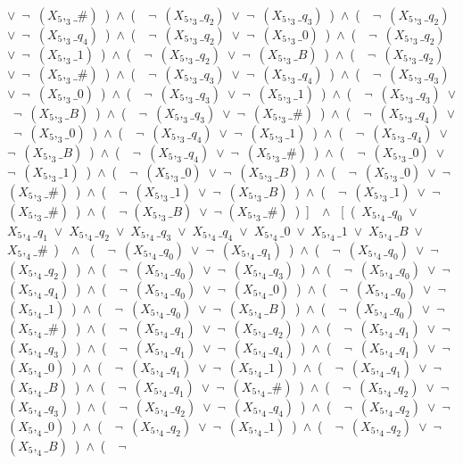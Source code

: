 ﻿\documentclass[a4paper,10pt]{article}
\begin{document}
$\vee$\ $\neg$\ $(X_5,_3\_\#)$\ )\ $\wedge$\ (\ \ $\neg$\ $(X_5,_3\_q_2)$\ $\vee$\ $\neg$\ $(X_5,_3\_q_3)$\ )\ $\wedge$\ (\ \ $\neg$\ $(X_5,_3\_q_2)$\ $\vee$\ $\neg$\ $(X_5,_3\_q_4)$\ )\ $\wedge$\ (\ \ $\neg$\ $(X_5,_3\_q_2)$\ $\vee$\ $\neg$\ $(X_5,_3\_0)$\ )\ $\wedge$\ (\ \ $\neg$\ $(X_5,_3\_q_2)$\ $\vee$\ $\neg$\ $(X_5,_3\_1)$\ )\ $\wedge$\ (\ \ $\neg$\ $(X_5,_3\_q_2)$\ $\vee$\ $\neg$\ $(X_5,_3\_B)$\ )\ $\wedge$\ (\ \ $\neg$\ $(X_5,_3\_q_2)$\ $\vee$\ $\neg$\ $(X_5,_3\_\#)$\ )\ $\wedge$\ (\ \ $\neg$\ $(X_5,_3\_q_3)$\ $\vee$\ $\neg$\ $(X_5,_3\_q_4)$\ )\ $\wedge$\ (\ \ $\neg$\ $(X_5,_3\_q_3)$\ $\vee$\ $\neg$\ $(X_5,_3\_0)$\ )\ $\wedge$\ (\ \ $\neg$\ $(X_5,_3\_q_3)$\ $\vee$\ $\neg$\ $(X_5,_3\_1)$\ )\ $\wedge$\ (\ \ $\neg$\ $(X_5,_3\_q_3)$\ $\vee$\ $\neg$\ $(X_5,_3\_B)$\ )\ $\wedge$\ (\ \ $\neg$\ $(X_5,_3\_q_3)$\ $\vee$\ $\neg$\ $(X_5,_3\_\#)$\ )\ $\wedge$\ (\ \ $\neg$\ $(X_5,_3\_q_4)$\ $\vee$\ $\neg$\ $(X_5,_3\_0)$\ )\ $\wedge$\ (\ \ $\neg$\ $(X_5,_3\_q_4)$\ $\vee$\ $\neg$\ $(X_5,_3\_1)$\ )\ $\wedge$\ (\ \ $\neg$\ $(X_5,_3\_q_4)$\ $\vee$\ $\neg$\ $(X_5,_3\_B)$\ )\ $\wedge$\ (\ \ $\neg$\ $(X_5,_3\_q_4)$\ $\vee$\ $\neg$\ $(X_5,_3\_\#)$\ )\ $\wedge$\ (\ \ $\neg$\ $(X_5,_3\_0)$\ $\vee$\ $\neg$\ $(X_5,_3\_1)$\ )\ $\wedge$\ (\ \ $\neg$\ $(X_5,_3\_0)$\ $\vee$\ $\neg$\ $(X_5,_3\_B)$\ )\ $\wedge$\ (\ \ $\neg$\ $(X_5,_3\_0)$\ $\vee$\ $\neg$\ $(X_5,_3\_\#)$\ )\ $\wedge$\ (\ \ $\neg$\ $(X_5,_3\_1)$\ $\vee$\ $\neg$\ $(X_5,_3\_B)$\ )\ $\wedge$\ (\ \ $\neg$\ $(X_5,_3\_1)$\ $\vee$\ $\neg$\ $(X_5,_3\_\#)$\ )\ $\wedge$\ (\ \ $\neg$ $(X_5,_3\_B)$\ $\vee$\ $\neg$ $(X_5,_3\_\#)$\ )\ ]\ \ $\wedge$ \ [\ (\ $X_5,_4\_q_0$\ $\vee$\ $X_5,_4\_q_1$\ $\vee$\ $X_5,_4\_q_2$\ $\vee$\ $X_5,_4\_q_3$\ $\vee$\ $X_5,_4\_q_4$\ $\vee$\ $X_5,_4\_0$\ $\vee$\ $X_5,_4\_1$\ $\vee$\ $X_5,_4\_B$\ $\vee$\ $X_5,_4\_\#$\ )\ \ $\wedge$ \ (\ \ $\neg$\ $(X_5,_4\_q_0)$\ $\vee$\ $\neg$\ $(X_5,_4\_q_1)$\ )\ $\wedge$\ (\ \ $\neg$\ $(X_5,_4\_q_0)$\ $\vee$\ $\neg$\ $(X_5,_4\_q_2)$\ )\ $\wedge$\ (\ \ $\neg$\ $(X_5,_4\_q_0)$\ $\vee$\ $\neg$\ $(X_5,_4\_q_3)$\ )\ $\wedge$\ (\ \ $\neg$\ $(X_5,_4\_q_0)$\ $\vee$\ $\neg$\ $(X_5,_4\_q_4)$\ )\ $\wedge$\ (\ \ $\neg$\ $(X_5,_4\_q_0)$\ $\vee$\ $\neg$\ $(X_5,_4\_0)$\ )\ $\wedge$\ (\ \ $\neg$\ $(X_5,_4\_q_0)$\ $\vee$\ $\neg$\ $(X_5,_4\_1)$\ )\ $\wedge$\ (\ \ $\neg$\ $(X_5,_4\_q_0)$\ $\vee$\ $\neg$\ $(X_5,_4\_B)$\ )\ $\wedge$\ (\ \ $\neg$\ $(X_5,_4\_q_0)$\ $\vee$\ $\neg$\ $(X_5,_4\_\#)$\ )\ $\wedge$\ (\ \ $\neg$\ $(X_5,_4\_q_1)$\ $\vee$\ $\neg$\ $(X_5,_4\_q_2)$\ )\ $\wedge$\ (\ \ $\neg$\ $(X_5,_4\_q_1)$\ $\vee$\ $\neg$\ $(X_5,_4\_q_3)$\ )\ $\wedge$\ (\ \ $\neg$\ $(X_5,_4\_q_1)$\ $\vee$\ $\neg$\ $(X_5,_4\_q_4)$\ )\ $\wedge$\ (\ \ $\neg$\ $(X_5,_4\_q_1)$\ $\vee$\ $\neg$\ $(X_5,_4\_0)$\ )\ $\wedge$\ (\ \ $\neg$\ $(X_5,_4\_q_1)$\ $\vee$\ $\neg$\ $(X_5,_4\_1)$\ )\ $\wedge$\ (\ \ $\neg$\ $(X_5,_4\_q_1)$\ $\vee$\ $\neg$\ $(X_5,_4\_B)$\ )\ $\wedge$\ (\ \ $\neg$\ $(X_5,_4\_q_1)$\ $\vee$\ $\neg$\ $(X_5,_4\_\#)$\ )\ $\wedge$\ (\ \ $\neg$\ $(X_5,_4\_q_2)$\ $\vee$\ $\neg$\ $(X_5,_4\_q_3)$\ )\ $\wedge$\ (\ \ $\neg$\ $(X_5,_4\_q_2)$\ $\vee$\ $\neg$\ $(X_5,_4\_q_4)$\ )\ $\wedge$\ (\ \ $\neg$\ $(X_5,_4\_q_2)$\ $\vee$\ $\neg$\ $(X_5,_4\_0)$\ )\ $\wedge$\ (\ \ $\neg$\ $(X_5,_4\_q_2)$\ $\vee$\ $\neg$\ $(X_5,_4\_1)$\ )\ $\wedge$\ (\ \ $\neg$\ $(X_5,_4\_q_2)$\ $\vee$\ $\neg$\ $(X_5,_4\_B)$\ )\ $\wedge$\ (\ \ $\neg$\ 
\end{document}

